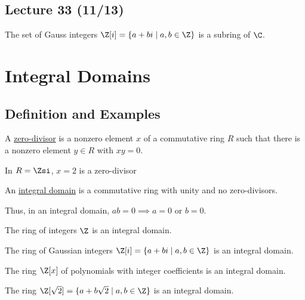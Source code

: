 \subsection*{Lecture 33 (11/13)} %

\begin{example}
  The set of Gauss integers \(\Z[i] = \{a+bi\mid a,b\in\Z\}\) is a subring of \(\C\).
\end{example}

\section{Integral Domains}
\subsection{Definition and Examples}
\begin{definition}
  A \uline{zero-divisor} is a nonzero element \(x\) of a commutative ring \(R\) such that there is
  a nonzero element \(y\in R\) with \(xy=0\).
\end{definition}

\begin{example}
  In \(R = \Zsi\), \(x=2\) is a zero-divisor
\end{example}

\begin{definition}
  An \uline{integral domain} is a commutative ring with unity and no zero-divisors.
\end{definition}

Thus, in an integral domain, \(ab=0\implies a=0\) or \(b=0\).

\begin{example}
  The ring of integers \(\Z\) is an integral domain.
\end{example}

\begin{example}
  The ring of Gaussian integers \(\Z[i] = \{a+bi \mid a,b\in\Z\}\) is an integral domain.
\end{example}

\begin{example}
  The ring \(\Z[x]\) of polynomials with integer coefficients is an integral domain.
\end{example}

\begin{example}
  The ring \(\Z[\sqrt{2}]=\{a+b\sqrt{2}\mid a,b\in\Z\}\) is an integral domain.
\end{example}

